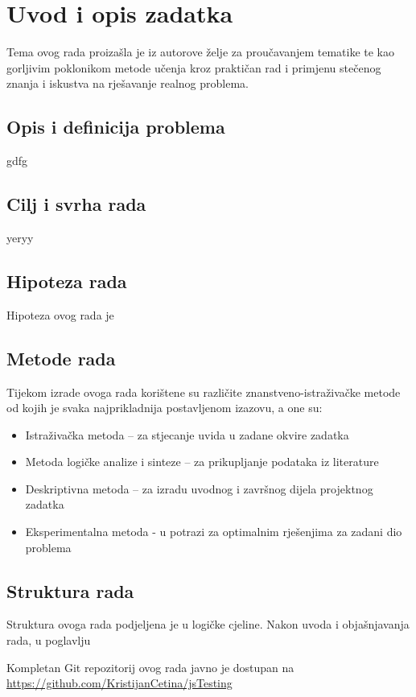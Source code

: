 \chapter{Uvod i opis zadatka}\label{OpisIOgranicenja}
Tema ovog rada proizašla je iz autorove želje za proučavanjem tematike te kao gorljivim poklonikom metode učenja kroz praktičan rad i primjenu stečenog znanja i iskustva na rješavanje realnog problema.


\section{Opis i definicija problema}
gdfg

\section{Cilj i svrha rada}
yeryy

\section{Hipoteza rada}
Hipoteza ovog rada je 

\section{Metode rada}
Tijekom izrade ovoga rada korištene su različite znanstveno-istraživačke metode od kojih je svaka najprikladnija postavljenom izazovu, a one su:
\begin{itemize}
\item Istraživačka metoda – za stjecanje uvida u zadane okvire zadatka
\item Metoda logičke analize i sinteze – za prikupljanje podataka iz literature
\item Deskriptivna metoda – za izradu uvodnog i završnog dijela projektnog zadatka
\item Eksperimentalna metoda - u potrazi za optimalnim rješenjima za zadani dio problema
\end{itemize}

\section{Struktura rada}
Struktura ovoga rada podjeljena je u logičke cjeline.
Nakon uvoda i objašnjavanja rada, u poglavlju 

Kompletan Git repozitorij ovog rada javno je dostupan na \url{https://github.com/KristijanCetina/jsTesting}